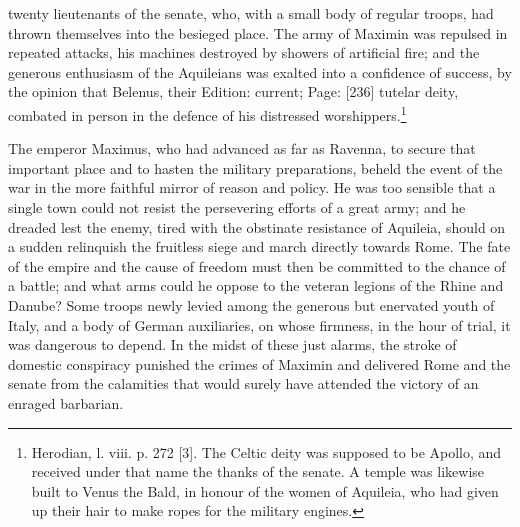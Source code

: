 twenty lieutenants of the senate, who, with a small body of regular troops, had thrown themselves into the besieged place. The army of Maximin was repulsed in repeated attacks, his machines destroyed by showers of artificial fire; and the generous enthusiasm of the Aquileians was exalted into a confidence of success, by the opinion that Belenus, their Edition: current; Page: [236] tutelar deity, combated in person in the defence of his distressed worshippers.\footnote{Herodian, l. viii. p. 272 [3]. The Celtic deity was supposed to be Apollo, and received under that name the thanks of the senate. A temple was likewise built to Venus the Bald, in honour of the women of Aquileia, who had given up their hair to make ropes for the military engines.}

The emperor Maximus, who had advanced as far as Ravenna, to secure that important place and to hasten the military preparations, beheld the event of the war in the more faithful mirror of reason and policy. He was too sensible that a single town could not resist the persevering efforts of a great army; and he dreaded lest the enemy, tired with the obstinate resistance of Aquileia, should on a sudden relinquish the fruitless siege and march directly towards Rome. The fate of the empire and the cause of freedom must then be committed to the chance of a battle; and what arms could he oppose to the veteran legions of the Rhine and Danube? Some troops newly levied among the generous but enervated youth of Italy, and a body of German auxiliaries, on whose firmness, in the hour of trial, it was dangerous to depend. In the midst of these just alarms, the stroke of domestic conspiracy punished the crimes of Maximin and delivered Rome and the senate from the calamities that would surely have attended the victory of an enraged barbarian.

